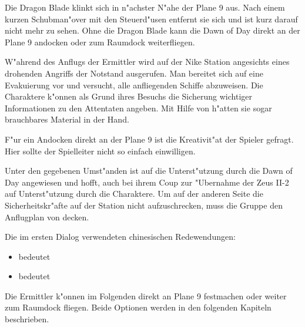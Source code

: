 Die Dragon Blade klinkt sich in n"achster N"ahe der Plane 9 aus. Nach einem kurzen Schubman"over mit den Steuerd"usen entfernt sie sich und ist kurz darauf nicht mehr zu sehen. Ohne die Dragon Blade kann die Dawn of Day direkt an der Plane 9 andocken oder zum Raumdock weiterfliegen.
\vfill

\begin{remarks}
	W"ahrend des Anflugs der Ermittler wird auf der Nike Station angesichts eines drohenden Angriffs der Notstand ausgerufen. Man bereitet sich auf eine Evakuierung vor und versucht, alle anfliegenden Schiffe abzuweisen. Die Charaktere k"onnen als Grund ihres Besuchs die Sicherung wichtiger Informationen zu den Attentaten angeben. Mit Hilfe von \ml{} h"atten sie sogar brauchbares Material in der Hand. 
	
	F"ur ein Andocken direkt an der Plane 9 ist die Kreativit"at der Spieler gefragt. Hier sollte der Spielleiter nicht so einfach einwilligen.

	Unter den gegebenen Umst"anden ist \xl{} auf die Unterst"utzung durch die Dawn of Day angewiesen und hofft, auch bei ihrem Coup zur "Ubernahme der Zeus II-2 auf Unterst"utzung durch die Charaktere. Um auf der anderen Seite die Sicherheitskr"afte auf der Station nicht aufzuschrecken, muss die Gruppe den Anflugplan von \xl{} decken.

	Die im ersten Dialog verwendeten chinesischen Redewendungen:
	
	\begin{itemize}
		\item {} bedeutet 
		\item {} bedeutet 
	\end{itemize}

	Die Ermittler k"onnen im Folgenden direkt an Plane 9 festmachen oder weiter zum Raumdock fliegen. Beide Optionen werden in den folgenden Kapiteln beschrieben.
\end{remarks}
